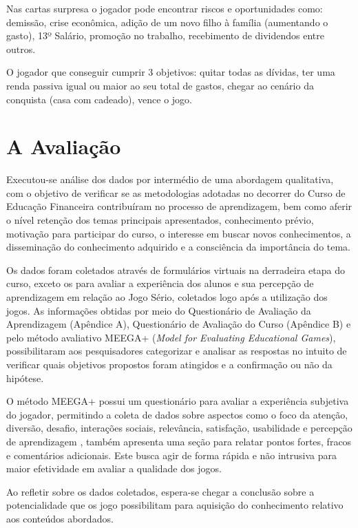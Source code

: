 Nas cartas surpresa o jogador pode encontrar riscos e oportunidades como: demissão, crise econômica, adição de um novo filho à família (aumentando o gasto), 13º Salário, promoção no trabalho, recebimento de dividendos entre outros.

O jogador que conseguir cumprir 3 objetivos: quitar todas as dívidas, ter uma renda passiva igual ou maior ao seu total de gastos, chegar ao cenário da conquista (casa com cadeado), vence o jogo.

\section{A Avaliação}
Executou-se análise dos dados por intermédio de uma abordagem qualitativa, com o objetivo de verificar se as metodologias adotadas no decorrer do Curso de Educação Financeira contribuíram no processo de aprendizagem, bem como aferir o nível retenção dos temas principais apresentados, conhecimento prévio, motivação para participar do curso, o interesse em buscar novos conhecimentos, a disseminação do conhecimento adquirido e a consciência da importância do tema.

Os dados foram coletados através de formulários virtuais na derradeira etapa do curso, exceto os para avaliar a experiência dos alunos e sua percepção de aprendizagem em relação ao Jogo Sério, coletados logo após a utilização dos jogos. As informações obtidas por meio do Questionário de Avaliação da Aprendizagem (Apêndice A), Questionário de Avaliação do Curso (Apêndice B) e pelo método avaliativo MEEGA+ (\textit{Model for Evaluating Educational Games}), possibilitaram aos pesquisadores categorizar e analisar as respostas no intuito de verificar quais objetivos propostos foram atingidos e a confirmação ou não da hipótese.

O método MEEGA+ possui um questionário para avaliar a experiência subjetiva do jogador, permitindo a coleta de dados sobre aspectos como o foco da atenção, diversão, desafio, interações sociais, relevância, satisfação, usabilidade e percepção de aprendizagem \cite{petri2017}, também apresenta uma seção para relatar pontos fortes, fracos e comentários adicionais. Este busca agir de forma rápida e não intrusiva para maior efetividade em avaliar a qualidade dos jogos.

Ao refletir sobre os dados coletados, espera-se chegar a conclusão sobre a potencialidade que os jogo possibilitam para aquisição do conhecimento relativo aos conteúdos abordados.

